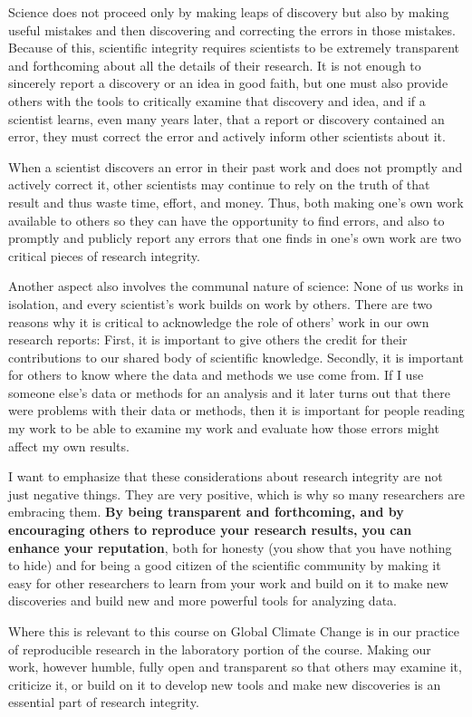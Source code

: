 \documentclass[11pt,twoside]{jgsyllabus}\usepackage[]{graphicx}\usepackage[]{color}
\begin{document}
Science does not proceed only by making leaps of discovery
but also by making useful mistakes and then discovering and correcting the
errors in those mistakes. Because of this, scientific integrity requires
scientists to be extremely transparent and forthcoming about all the details of
their research. It is not enough to sincerely report a discovery or an idea in
good faith, but one must also provide others with the tools to critically
examine that discovery and idea, and if a scientist learns, even many years
later, that a report or discovery contained an error, they must
correct the error and actively inform other scientists about it.

When a scientist discovers an error in their past work and does not promptly
and actively correct it, other scientists may continue to rely on the truth of
that result and thus waste time, effort, and money.
Thus, both making one's own work available to others so they can have the %
opportunity to find errors, and also to promptly and publicly report any
errors that one finds in one's own work are two critical pieces of research %
integrity.

Another aspect also involves the communal nature of science: None of us works
in isolation, and every scientist's work builds on work by others. %
There are two reasons why it is critical to acknowledge the role of others' %
work in our own research reports: First, it is important to give others the
credit for their contributions to our shared body of scientific knowledge.
Secondly, it is important for others to know where the data and methods we use
come from.
If I use someone else's data or methods for an analysis and it later turns %
out that there were problems with their data or methods, then it is important
for people reading my work to be able to examine my work and evaluate how those
errors might affect my own results.

I want to emphasize that these considerations about research integrity are not
just negative things. They are very positive, which is why so many researchers
are embracing them.
\textbf{By being transparent and forthcoming, and by encouraging
others to reproduce your research results, you can enhance your reputation},
both for honesty (you show that you have nothing to hide) and for being a
good citizen of the scientific community by making it easy for other researchers
to learn from your work and build on it to make new discoveries and build
new and more powerful tools for analyzing data.

Where this is relevant to this course on Global Climate Change is in our
practice of reproducible research in the laboratory portion of the course.
Making our work, however humble, fully open and transparent so that others
may examine it, criticize it, or build on it to develop new tools and make
new discoveries is an essential part of research integrity.
\end{document}
